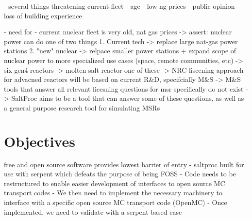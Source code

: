 - several things threatening current fleet
  - age
  - low ng prices
  - public opinion
  - loss of building experience

- need for 
- current nuclear fleet is very old, nat gas prices
 -> assert: nuclear power can do one of two things
    1. Current tech -> replace large nat-gas power stations 
    2. "new" nuclear -> relpace smaller power stations + expand scope
        of nuclear power to more specialized use cases (space, remote communities, etc)
-> six gen4 reactors -> molten salt reactor one of these
-> NRC liscening approach for advacned reactors will be based on current R\&D, specifcially M\&S
-> M\&S tools that answer all relevant licesning questions for msr specifically do not exist
-> SaltProc aims to be a tool that can answer some of these questions, as well as a general purpose
    research tool for simulating MSRs

\section{Objectives}%
\label{sec:objectives}

 free and open source software provides lowest barrier of entry
 - saltproc built for use with serpent which defeats the purpose of being
    FOSS
 - Code needs to be restructured to enable easier development of interfaces to 
 open source MC transport codes
 - We then need to implement the necessary machinery to interface with a specific
    open source MC transport code (OpenMC)
 - Once implemented, we need to validate with a serpent-based case
